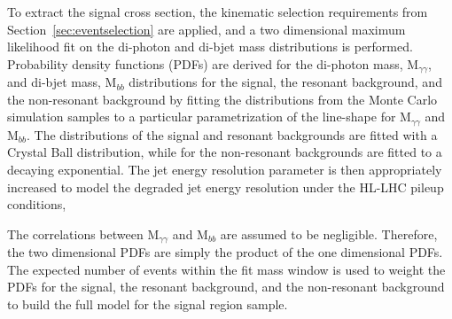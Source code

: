 To extract the signal cross section, the kinematic selection requirements from Section~\ref{sec:eventselection} are applied, and a two dimensional maximum
likelihood fit on the di-photon and di-bjet mass distributions is performed. Probability density functions (PDFs) are derived for the di-photon mass, $\mathrm{M}_{\gamma\gamma}$, and di-bjet mass, $\mathrm{M}_{bb}$
distributions for the signal, the resonant background, and the non-resonant background by 
fitting the distributions from the Monte Carlo simulation samples to a particular parametrization 
of the line-shape for $\mathrm{M}_{\gamma\gamma}$ and $\mathrm{M}_{bb}$. The distributions of the signal and resonant backgrounds are fitted with a Crystal Ball distribution, while for
the non-resonant backgrounds are fitted to a decaying exponential. The jet energy resolution parameter is then appropriately increased to model the degraded jet energy resolution under the HL-LHC pileup conditions,

The correlations between $\mathrm{M}_{\gamma\gamma}$ and $\mathrm{M}_{bb}$ are assumed to be negligible. Therefore, the two dimensional PDFs are simply the product of the one dimensional PDFs. The expected number of events within the fit mass window is used to weight the PDFs for the signal, the resonant background, and the non-resonant background to build the full model for the signal region sample.

